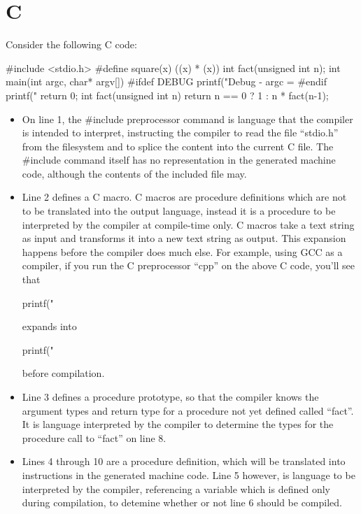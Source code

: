  \section{C}
Consider the following C code:

 \begin{code}
#include <stdio.h>
#define square(x) ((x) * (x))
int fact(unsigned int n);
int main(int argc, char* argv[]){
#ifdef DEBUG
  printf("Debug - argc = %
#endif
 printf("%
  return 0;
}
int fact(unsigned int n){
  return n == 0
    ? 1
    : n * fact(n-1);
}
 \end{code}

 \begin{itemize}
  \item
     On line 1, the \#include preprocessor command
     is language that the compiler
     is intended to interpret, instructing the compiler to
     read the file ``stdio.h''
     from the filesystem and to splice the content
     into the current C file.  The \#include command
     itself has no representation in the generated machine code, although the contents
     of the included file may.

  \item
     Line 2 defines a C macro. C macros are procedure definitions which
      are not to be translated into the output language, instead it is a procedure
     to be interpreted by the compiler
     at compile-time only.  C macros take a text
     string as input and transforms it into a new text string as output.
     This expansion happens before the compiler does much
     else.  For example, using GCC as a compiler, if you run the C preprocessor
     ``cpp'' on the above C code, you'll see that

     \begin{code}
  printf("%
     \end{code}

     \noindent expands into

     \begin{code}
  printf("%
     \end{code}

     \noindent before compilation.

  \item
     Line 3 defines a procedure prototype, so that
     the compiler knows the argument types and return type for a procedure not
     yet defined called ``fact''.
     It is language interpreted by the compiler to determine the types for the procedure
     call to ``fact'' on line 8.
  \item
     Lines 4 through 10 are a procedure definition, which will be
     translated into instructions in the generated machine code.  Line 5 however, is language
     to be interpreted by the compiler, referencing a variable which is defined
     only during compilation, to detemine whether or not line 6 should be
     compiled.
 \end{itemize}


